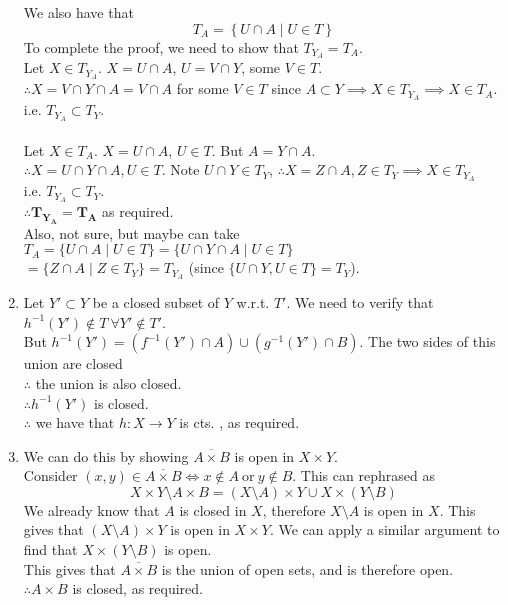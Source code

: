 \documentclass{article}
\newcommand{\cts}{cts. }
\theoremstyle{remark}
\theoremstyle{example}
\theoremstyle{examples}
\begin{document}
\begin{enumerate}
		We also have that \[T_A = \left\{U \cap A \mid U \in T \right\}\]
		To complete the proof, we need to show that $T_{Y_A} = T_A$.\\
		Let $X \in T_{Y_A}$. $X = U \cap A$, $U= V \cap Y$, some $V \in T$.\\
		$\therefore X=V \cap Y \cap A=V \cap A$ for some $V \in T$ since $A \subset Y \implies X \in T_{Y_A} \implies X \in T_A$.\\
		i.e. $T_{Y_A} \subset T_Y$.\\\\
		Let $X \in T_A$. $X=U \cap A$, $U \in T$. But $A=Y \cap A$.\\
		$\therefore X=U \cap Y \cap A, U \in T$. Note $U \cap Y \in T_Y$, $\therefore X=Z \cap A, Z \in T_Y \implies X \in T_{Y_A}$\\
		i.e.  $T_{Y_A} \subset T_Y$.\\
		$\mathbf{\therefore T_{Y_A}=T_A}$ as required.\\
		Also, not sure, but maybe can take $T_A = \{U \cap A \mid U \in T\} = \{U \cap Y \cap A \mid U \in T\}$\\
		$= \{Z \cap A \mid Z \in T_Y\}=T_{Y_A}$ (since $\{U \cap Y, U \in T\}=T_Y$).
		
		
		\item Let $Y' \subset Y$ be a closed subset of $Y$ w.r.t. $T'$. We need to verify that $h^{-1}(Y') \notin T\ \forall Y' \notin T'$.\\
		But $h^{-1}(Y')=(f^{-1}(Y')\cap A) \cup (g^{-1}(Y') \cap B)$. The two sides of this union are closed\\
		$\therefore$ the union is also closed.\\
		$\therefore h^{-1}(Y')$ is closed.\\
		$\therefore$ we have that $h:X \to Y$ is \cts, as required.
		
		\item We can do this by showing $\overline{A \times B}$ is open in $X \times Y$.\\
		Consider $(x,y) \in \overline{A  \times B} \iff x \notin A\ \mathrm{or}\ y \notin B$.
		This can rephrased as \[X \times Y \setminus A \times B = (X \setminus A) \times Y \cup X \times (Y \setminus B)\]
		We already know that $A$ is closed in $X$, therefore $X\setminus A$ is open in $X$. This gives that $(X \setminus A) \times Y$ is open in $X \times Y$. We can apply a similar argument to find that $X \times (Y \setminus B)$ is open.\\
		This gives that $\overline{A \times B}$ is the union of open sets, and is therefore open.\\
		$\therefore A \times B$ is closed, as required.
	\end{enumerate}
\end{document}
